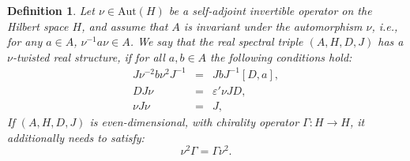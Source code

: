 \documentclass[a4paper,11pt]{article}
\newtheorem{definition}{Definition}
\begin{document}
\begin{definition}
  \cite{Magee,Dabrowski1} Let $\nu \in \mathrm{Aut} (H)$ be a self-adjoint
  invertible operator on the Hilbert space $H$, and assume that $A$ is
  invariant under the automorphism $\nu$, i.e., for any $a \in A$, $\nu^{- 1}
  a \nu \in A$. We say that the real spectral triple $(A, H, D, J)$ has a
  $\nu$-twisted real structure, if for all $a, b \in A$ the following
  conditions hold:
\begin{eqnarray}
    [D, a] J \nu^{- 2} b \nu^2 J^{- 1} &=& JbJ^{- 1}  [D, a],
\nonumber\\
    DJ \nu &=& \varepsilon' \nu JD,
\nonumber\\
    \nu J \nu &=& J,
\end{eqnarray}
  If $(A, H, D, J)$ is even-dimensional, with chirality operator $\Gamma : H
  \to H$, it additionally needs to satisfy:
  \begin{equation}
    \nu^2 \Gamma = \Gamma \nu^2 .
  \end{equation}
\end{definition}
\end{document}

